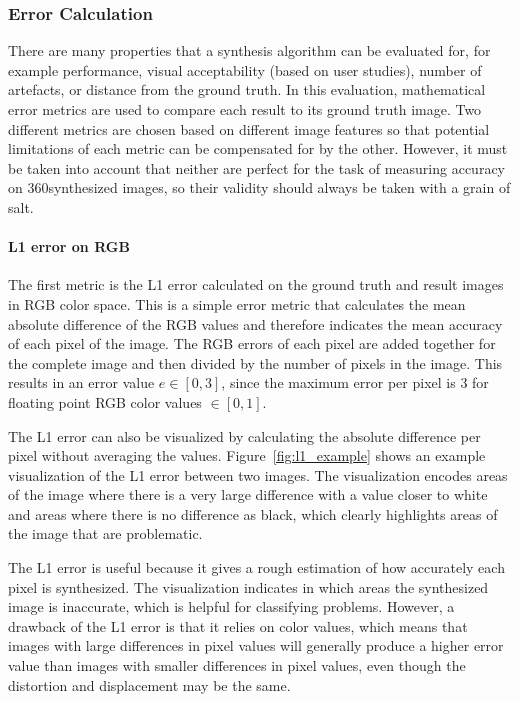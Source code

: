 \subsubsection{Error Calculation}
There are many properties that a synthesis algorithm can be evaluated for, for example performance, visual acceptability (based on user studies), number of artefacts, or distance from the ground truth. In this evaluation, mathematical
error metrics are used to compare each result to its ground truth image.  Two different metrics are chosen based on different image features so that potential limitations of each metric can be compensated for by the other. However, it must be taken into account that neither are perfect for the task of measuring accuracy on 360\degree synthesized images, so their validity should always be taken with a grain of salt. 

\paragraph{L1 error on RGB}
The first metric is the L1 error calculated on the ground truth and result images in RGB color space. This is a simple error metric that calculates the mean absolute difference of the RGB values and therefore indicates the mean accuracy of each pixel of the image. The RGB errors of each pixel are added together for the complete image and then divided by the number of pixels in the image. This results in an error value $e \in [0,3]$, since the maximum error per pixel is 3 for floating point RGB color values $\in [0,1]$.

The L1 error can also be visualized by calculating the absolute difference per pixel without averaging the values. Figure~\ref{fig:l1_example} shows an example visualization of the L1 error between two images. The visualization encodes areas of the image where there is a very large difference with a value closer to white and areas where there is no difference as black, which clearly highlights areas of the image that are problematic.

The L1 error is useful because it gives a rough estimation of how accurately each pixel is synthesized. The visualization indicates in which areas the synthesized image is inaccurate, which is helpful for classifying problems. However, a drawback of the L1 error is that it relies on color values, which means that images with large differences in pixel values will generally produce a higher error value than images with smaller differences in pixel values, even though the distortion and displacement may be the same. 

